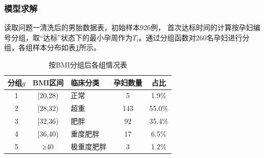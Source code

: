 \documentclass[withoutpreface,bwprint]{cumcmthesis} %
\begin{document}
\subsubsection{模型求解} 
读取问题一清洗后的男胎数据表，初始样本926例，  首次达标时间的计算按孕妇编号分组，取“达标”状态下的最小孕周作为$T_i$。通过分组函数对260名孕妇进行分组，各组样本分布如表\ref{tab:按BMI分组后各组情况表}所示。

\begin{table}[H]
    \centering  %
    \caption{按BMI分组后各组情况表}  %
    \label{tab:按BMI分组后各组情况表}  %
    \begin{threeparttable}
        \begin{tabularx}{0.62\textwidth}{c c l c c }
            \toprule[1.5pt]
            \textbf{分组$g$} & \textbf{BMI区间} & \textbf{临床分类} & \textbf{孕妇数量} & \textbf{占比}\\ 
            \midrule[1pt]
            1       & [20,28)    & 正常       & 5        & 1.9\%   \\
            2       & [28,32)    & 超重       & 143      & 55.0\%  \\
            3       & [32,36)    & 肥胖       & 92       & 35.4\%  \\
            4       & [36,40)    & 重度肥胖   & 17       & 6.5\%   \\
            5       & ≥40        & 极重度肥胖 & 3        & 1.2\%   \\

            \bottomrule[1.5pt]
        \end{tabularx}
    \end{threeparttable}
\end{table}
\end{document}
